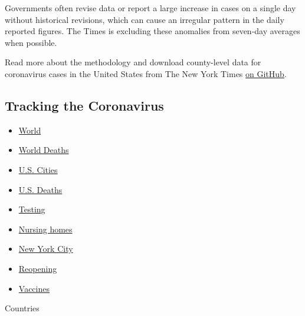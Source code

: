 Governments often revise data or report a large increase in cases on a
single day without historical revisions, which can cause an irregular
pattern in the daily reported figures. The Times is excluding these
anomalies from seven-day averages when possible.

Read more about the methodology and download county-level data for
coronavirus cases in the United States from The New York Times
\href{https://github.com/nytimes/covid-19-data}{on GitHub}.

\hypertarget{tracking-the-coronavirus}{%
\subsection{Tracking the Coronavirus}\label{tracking-the-coronavirus}}

\begin{itemize}
\tightlist
\item
  \href{https://www.nytimes.com/interactive/2020/world/coronavirus-maps.html}{World}
\item
  \href{https://www.nytimes.com/interactive/2020/04/21/world/coronavirus-missing-deaths.html}{World
  Deaths}
\item
  \href{https://www.nytimes.com/interactive/2020/04/23/upshot/five-ways-to-monitor-coronavirus-outbreak-us.html}{U.S.
  Cities}
\item
  \href{https://www.nytimes.com/interactive/2020/05/05/us/coronavirus-death-toll-us.html}{U.S.
  Deaths}
\item
  \href{https://www.nytimes.com/interactive/2020/us/coronavirus-testing.html}{Testing}
\item
  \href{https://www.nytimes.com/interactive/2020/us/coronavirus-nursing-homes.html}{Nursing
  homes}
\item
  \href{https://www.nytimes.com/interactive/2020/nyregion/new-york-city-coronavirus-cases.html}{New
  York City}
\item
  \href{https://www.nytimes.com/interactive/2020/us/states-reopen-map-coronavirus.html}{Reopening}
\item
  \href{https://www.nytimes.com/interactive/2020/science/coronavirus-vaccine-tracker.html}{Vaccines}
\end{itemize}

Countries

